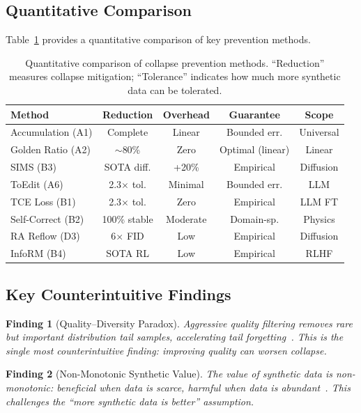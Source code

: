 \documentclass[11pt]{article}
\newtheorem{finding}{Finding}
\begin{document}
\subsection{Quantitative Comparison}

Table~\ref{tab:comparison} provides a quantitative comparison of key prevention methods.

\begin{table}[t]
\centering
\small
\begin{tabular}{@{}lcccc@{}}
\toprule
\textbf{Method} & \textbf{Reduction} & \textbf{Overhead} & \textbf{Guarantee} & \textbf{Scope} \\
\midrule
Accumulation (A1) & Complete & Linear & Bounded err. & Universal \\
Golden Ratio (A2) & $\sim$80\% & Zero & Optimal (linear) & Linear \\
SIMS (B3) & SOTA diff. & +20\% & Empirical & Diffusion \\
ToEdit (A6) & 2.3$\times$ tol. & Minimal & Bounded err. & LLM \\
TCE Loss (B1) & 2.3$\times$ tol. & Zero & Empirical & LLM FT \\
Self-Correct (B2) & 100\% stable & Moderate & Domain-sp. & Physics \\
RA Reflow (D3) & 6$\times$ FID & Low & Empirical & Diffusion \\
InfoRM (B4) & SOTA RL & Low & Empirical & RLHF \\
\bottomrule
\end{tabular}
\caption{Quantitative comparison of collapse prevention methods. ``Reduction'' measures collapse mitigation; ``Tolerance'' indicates how much more synthetic data can be tolerated.}
\label{tab:comparison}
\end{table}

\subsection{Key Counterintuitive Findings}

\begin{finding}[Quality--Diversity Paradox]
Aggressive quality filtering removes rare but important distribution tail samples, accelerating tail forgetting~\citep{illusion2025}. This is the single most counterintuitive finding: \textit{improving quality can worsen collapse}.
\end{finding}

\begin{finding}[Non-Monotonic Synthetic Value]
The value of synthetic data is non-monotonic: beneficial when data is scarce, harmful when data is abundant~\citep{feng2024collapse}. This challenges the ``more synthetic data is better'' assumption.
\end{finding}
\end{document}
